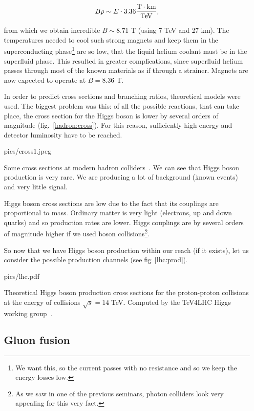\[
	B\rho \sim E \cdot 3.36 \frac{\rm T\cdot km}{\rm TeV} ,
\]

from which we obtain incredible $B \sim 8.71$ T (using 7 TeV and 27 km). The temperatures needed to cool such strong magnets and keep
them in the
superconducting phase\footnote{We want this, so the current passes with no resistance and so we keep the energy losses low.} are so
low, that the liquid helium coolant must be in the superfluid phase. This resulted in greater complications, since superfluid helium
passes through most of the known materials as if through a strainer. Magnets are now expected to operate at $B = 8.36$ T.

In order to predict cross sections and branching ratios, theoretical models were used. The biggest problem was this: of all the
possible reactions, that can take place, the cross section for the Higgs boson is lower by several orders of magnitude
(fig.~\ref{hadron:cross}). For this reason, sufficiently high energy and detector luminosity have to be reached.

\vspace{12pt}
\begin{myfig}[9cm]{pics/cross1.jpeg}
	\caption{Some cross sections at modern hadron colliders~\cite{paussdittmar}. We can see that Higgs boson production is very rare.
		We are producing a lot of background (known events) and very little signal.}
	\label{hadron:cross}
\end{myfig}

Higgs boson cross sections are low due to the fact that its couplings are proportional to mass. Ordinary matter is very light (electrons,
up and down quarks) and so production rates are lower. Higgs
couplings are by several orders of magnitude higher if we used boson collisions\footnote{As we saw in one of the previous seminars,
photon colliders look very appealing for this very fact.}. 

So now that we have Higgs boson production within our reach (if it exists), let us consider the possible production channels (see
fig~\ref{lhc:prod}).

\begin{myfig}[11.5cm]{pics/lhc.pdf}
	\caption{Theoretical Higgs boson production cross sections for the proton-proton collisions at the energy of collisions
		$\sqrt{s} = 14$ TeV. Computed by the TeV4LHC Higgs working group~\cite{tev4lhc}.}
	\label{lhc:prod}
\end{myfig}

\subsection{Gluon fusion}

